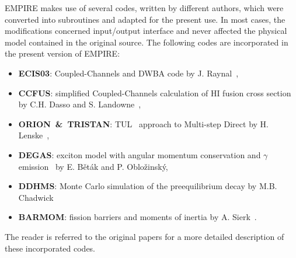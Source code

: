 \documentclass[twocolumn,amsmath,amssymb,10pt,groupedaddress,a4paper]{revtex4}
\begin{document}
EMPIRE makes use of several codes, written by different authors, which
 were converted into subroutines and adapted for the present use.
In most cases, the modifications concerned input/output interface
and never affected the physical model contained in the original source.
The following codes are incorporated in the present version of EMPIRE:
\begin{itemize}
\item \textbf{ECIS03}: Coupled-Channels
and DWBA code by J. Raynal~\cite{ECIS},
\item \textbf{CCFUS}: simplified Coupled-Channels calculation
of HI fusion cross section by C.H. Dasso and S. Landowne~\cite{CCFUS},
\item \textbf{ORION~\&~TRISTAN}: TUL~\cite{TUL}
approach to Multi-step Direct by H. Lenske~\cite{ORTRI},
\item \textbf{DEGAS}: exciton model with angular momentum
conservation and $\gamma$ emission~\cite{Degas} by E. B\v et\' ak
and P. Oblo\v zinsk\' y,
\item \textbf{DDHMS}: Monte Carlo simulation of the preequilibrium
decay by M.B. Chadwick~\cite{DDHMScode}
\item \textbf{BARMOM}: fission barriers and moments of inertia
by A. Sierk~\cite{sierk}.
\end{itemize}
The reader is referred to the original papers for a more detailed
description of these incorporated codes.



\end{document}
